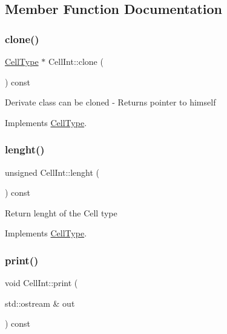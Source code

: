 \subsection{Member Function Documentation}
\mbox{\label{class_cell_int_a767b15d99c5ec0e2594dc35300e51873}} 
\subsubsection{\texorpdfstring{clone()}{clone()}}
{\footnotesize\ttfamily \hyperlink{class_cell_type}{Cell\+Type} $\ast$ Cell\+Int\+::clone (\begin{DoxyParamCaption}{ }\end{DoxyParamCaption}) const\hspace{0.3cm}{\ttfamily [virtual]}}

Derivate class can be cloned -\/ Returns pointer to himself 

Implements \hyperlink{class_cell_type_a8c534b1eed27659429f761fc76d51b89}{Cell\+Type}.

\mbox{\label{class_cell_int_afcab8270ff1853a08460051e02e62ace}} 
\subsubsection{\texorpdfstring{lenght()}{lenght()}}
{\footnotesize\ttfamily unsigned Cell\+Int\+::lenght (\begin{DoxyParamCaption}{ }\end{DoxyParamCaption}) const\hspace{0.3cm}{\ttfamily [virtual]}}

Return lenght of the Cell type 

Implements \hyperlink{class_cell_type_a1f8bd268dbd474dd8e08726a6efac066}{Cell\+Type}.

\mbox{\label{class_cell_int_a1cb8461721999308790d105adff41cd2}} 
\subsubsection{\texorpdfstring{print()}{print()}}
{\footnotesize\ttfamily void Cell\+Int\+::print (\begin{DoxyParamCaption}\item[{std\+::ostream \&}]{out }\end{DoxyParamCaption}) const\hspace{0.3cm}{\ttfamily [virtual]}}

